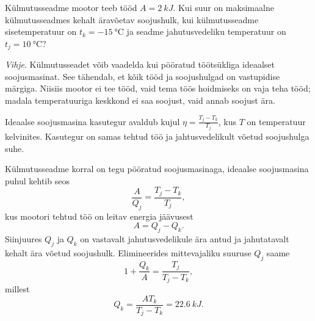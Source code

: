 
Külmutusseadme mootor teeb tööd $A = \SI{2}{kJ}$. Kui suur on maksimaalne külmutusseadmes kehalt äravõetav soojushulk, kui külmutusseadme sisetemperatuur on $t_k = \SI{-15}{\degreeCelsius}$ ja seadme jahutusvedeliku temperatuur on $t_j = \SI{10}{\degreeCelsius}$?

\emph{Vihje}.
Külmutusseadet võib vaadelda kui pööratud töötsükliga ideaalset soojusmasinat. See tähendab, et kõik tööd ja soojushulgad on vastupidise märgiga.
Niisiis mootor ei tee tööd, vaid tema töös hoidmiseks on vaja teha tööd; madala
temperatuuriga keskkond ei saa soojust, vaid annab soojust ära. 

\hint
Ideaalse soojusmasina kasutegur avaldub kujul $\eta = \frac{T_{j} - T_{k}}{T_{j}}$, kus $T$ on temperatuur kelvinites. Kasutegur on samas tehtud töö ja jahtusvedelikult võetud soojushulga suhe.

\solu
Külmutusseadme korral on tegu pööratud soojusmasinaga, ideaalse
soojusmasina puhul kehtib seos
\[
\frac{A}{Q_{j}}=\frac{T_{j} - T_{k}}{T_{j}},
\]
kus mootori tehtud töö
on leitav energia jäävusest
\[
A = Q_j - Q_k.
\]
Siinjuures $Q_j$ ja $Q_k$ on vastavalt jahutusvedelikule ära antud ja jahutatavalt kehalt
ära võetud soojushulk. Elimineerides mittevajaliku suuruse $Q_j$ saame
\[
1+\frac{Q_{k}}{A}=\frac{T_{j}}{T_{j}-T_{k}},
\]
millest 
\[
Q_{k}=\frac{A T_{k}}{T_{j}-T_{k}} = \SI{22,6}{kJ}.
\]
\probend